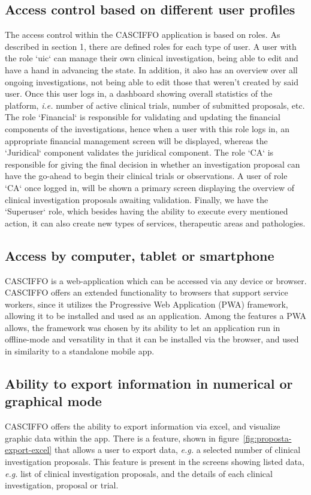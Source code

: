 \subsection{Access control based on different user profiles}
\label{subsec:access-control-based-user-profiles}
The access control within the CASCIFFO application is based on roles.
As described in section 1, there are defined roles for each type of user.  
A user with the role `\acrshort{uic}` can manage their own clinical investigation, being able to edit and have a hand in advancing the state. In addition, it also has an overview over all ongoing investigations, not being able to edit those that weren't created by said user. Once this user logs in, a dashboard showing overall statistics of the platform, \textit{i.e.} number of active clinical trials, number of submitted proposals, etc.
The role `Financial` is responsible for validating and updating the financial components of the investigations, hence when a user with this role logs in, an appropriate financial management screen will be displayed, whereas the `Juridical` component validates the juridical component.  
The role `CA` is responsible for giving the final decision in whether an investigation proposal can have the go-ahead to begin their clinical trials or observations.  
A user of role `CA` once logged in, will be shown a primary screen displaying the overview of clinical investigation proposals awaiting validation.
Finally, we have the `Superuser` role, which besides having the ability to execute every mentioned action, it can also create new types of services, therapeutic areas and pathologies.


\subsection{Access by computer, tablet or smartphone}
\label{subsec:access-by-mobile-device}
CASCIFFO is a web-application which can be accessed via any device or browser. CASCIFFO offers an extended functionality to browsers that support service workers, since it utilizes the Progressive Web Application (PWA) framework, allowing it to be installed and used as an application.
Among the features a PWA allows, the framework was chosen by its ability to let an application run in offline-mode and versatility in that it can be installed via the browser, and used in similarity to a standalone mobile app. 

\subsection{Ability to export information in numerical or graphical mode}
\label{subsec:ability-to-export-info}
CASCIFFO offers the ability to export information via excel, and visualize graphic data within the app.  
There is a feature, shown in figure~\ref{fig:proposta-export-excel} that allows a user to export data, \textit{e.g.} a selected number of clinical investigation proposals. This feature is present in the screens showing listed data, \textit{e.g.} list of clinical investigation proposals, and the details of each clinical investigation, proposal or trial.

